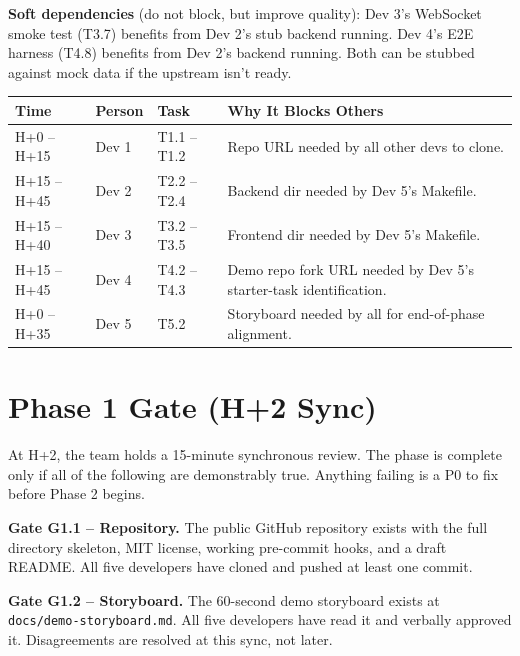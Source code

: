 \documentclass[11pt,letterpaper]{article}
\begin{document}
\begin{warning}
\textbf{Soft dependencies} (do not block, but improve quality):
Dev 3's WebSocket smoke test (T3.7) benefits from Dev 2's stub backend running. Dev 4's E2E harness (T4.8) benefits from Dev 2's backend running. Both can be stubbed against mock data if the upstream isn't ready.
\end{warning}

\begin{longtable}{|p{1.2cm}|p{2.5cm}|p{3cm}|p{6cm}|}
\hline
\rowcolor{ibmblue!10}
\textbf{Time} & \textbf{Person} & \textbf{Task} & \textbf{Why It Blocks Others} \\
\hline
H+0 -- H+15 & Dev 1 & T1.1 -- T1.2 & Repo URL needed by all other devs to clone. \\
\hline
H+15 -- H+45 & Dev 2 & T2.2 -- T2.4 & Backend dir needed by Dev 5's Makefile. \\
\hline
H+15 -- H+40 & Dev 3 & T3.2 -- T3.5 & Frontend dir needed by Dev 5's Makefile. \\
\hline
H+15 -- H+45 & Dev 4 & T4.2 -- T4.3 & Demo repo fork URL needed by Dev 5's starter-task identification. \\
\hline
H+0 -- H+35 & Dev 5 & T5.2 & Storyboard needed by all for end-of-phase alignment. \\
\hline
\end{longtable}

\section{Phase 1 Gate (H+2 Sync)}

At H+2, the team holds a 15-minute synchronous review. The phase is complete only if all of the following are demonstrably true. Anything failing is a P0 to fix before Phase 2 begins.

\begin{gate}
\textbf{Gate G1.1 -- Repository.} The public GitHub repository exists with the full directory skeleton, MIT license, working pre-commit hooks, and a draft README. All five developers have cloned and pushed at least one commit.
\end{gate}

\begin{gate}
\textbf{Gate G1.2 -- Storyboard.} The 60-second demo storyboard exists at \texttt{docs/demo-storyboard.md}. All five developers have read it and verbally approved it. Disagreements are resolved at this sync, not later.
\end{gate}
\end{document}
